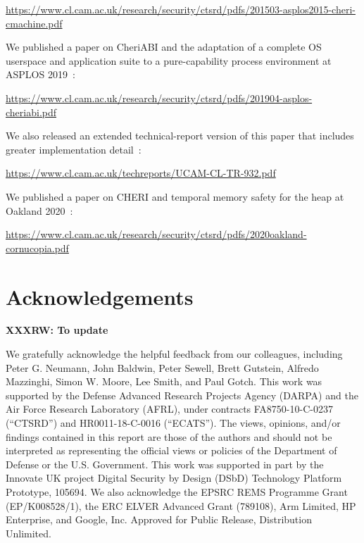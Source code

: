 \documentclass[12pt,twoside,openright,a4paper]{article}
\begin{document}
\smallskip
\noindent
\url{https://www.cl.cam.ac.uk/research/security/ctsrd/pdfs/201503-asplos2015-cheri-cmachine.pdf}
\smallskip

\noindent
We published a paper on CheriABI and the adaptation of a complete OS userspace
and application suite to a pure-capability process environment at ASPLOS
2019~\cite{davis2019:cheriabi}:

\smallskip
\noindent
\url{https://www.cl.cam.ac.uk/research/security/ctsrd/pdfs/201904-asplos-cheriabi.pdf}
\smallskip

\noindent
We also released an extended technical-report version of this paper that
includes greater implementation detail~\cite{UCAM-CL-TR-932}:

\smallskip
\noindent
\url{https://www.cl.cam.ac.uk/techreports/UCAM-CL-TR-932.pdf}
\smallskip

\noindent
We published a paper on CHERI and temporal memory safety for the heap at
Oakland 2020~\cite{filardo:cornucopia}:

\smallskip
\noindent
\url{https://www.cl.cam.ac.uk/research/security/ctsrd/pdfs/2020oakland-cornucopia.pdf}
\smallskip


\section{Acknowledgements}

\textbf{XXXRW: To update}

We gratefully acknowledge the helpful feedback from our colleagues, including
Peter G. Neumann, John Baldwin, Peter Sewell, Brett
Gutstein, Alfredo Mazzinghi, Simon W. Moore, Lee Smith, and Paul Gotch.
This work was supported by the Defense Advanced Research Projects Agency (DARPA) and the Air Force Research Laboratory (AFRL), under contracts
FA8750-10-C-0237 (``CTSRD'') and HR0011-18-C-0016 (``ECATS'').
The views, opinions, and/or findings contained in this report are those of the authors and should not be interpreted as representing the official views or policies of the Department of Defense or the U.S. Government.
This work was supported in part by the Innovate UK project Digital Security by
Design (DSbD) Technology Platform Prototype, 105694.
We also acknowledge the EPSRC REMS Programme Grant (EP/K008528/1), the
ERC ELVER Advanced Grant (789108), Arm Limited,
HP Enterprise, and Google, Inc.
Approved for Public Release, Distribution Unlimited.



\end{document}
